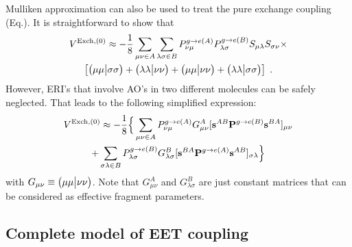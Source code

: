 Mulliken approximation can also be used to treat the pure exchange coupling (Eq.).
It is straightforward to show that
%
\begin{multline}\label{e:v0-exch-mulliken}
V^{{\rm Exch},(0)} \approx -\frac{1}{8} \sum_{\mu\nu\in A} \sum_{\lambda\sigma\in B} 
 P_{\nu\mu}^{g\rightarrow e(A)} P_{\lambda\sigma}^{g\rightarrow e(B)} 
 S_{\mu\lambda}  S_{\sigma\nu} \times \\
 \left[ \bigl( {\mu\mu} \bigl\lvert {\sigma\sigma} \bigr) + \bigl( {\lambda\lambda} \bigl\lvert {\nu\nu} \bigr) 
      + \bigl( {\mu\mu} \bigl\lvert {\nu\nu} \bigr) + \bigl( {\lambda\lambda} \bigl\lvert {\sigma\sigma} \bigr)\right] \;.
\end{multline}
%
However, ERI's that involve AO's in two different molecules can be safely neglected.
That leads to the following simplified expression:
%
\begin{multline}\label{e:v0-exch.mulliken.working}
V^{{\rm Exch},(0)} \approx 
  -\frac{1}{8} \Big\{ \sum_{\mu\nu\in A} P_{\nu\mu}^{g\rightarrow e(A)} G_{\mu\nu}^A
    [{\bf s}^{AB} {\bf P}^{g\rightarrow e(B)} {\bf s}^{BA} ]_{\mu\nu} \\
  + \sum_{\sigma\lambda\in B} P_{\lambda\sigma}^{g\rightarrow e(B)} G_{\lambda\sigma}^B
    [{\bf s}^{BA} {\bf P}^{g\rightarrow e(A)} {\bf s}^{AB} ]_{\sigma\lambda} 
  \Big\}
\end{multline}
%
with $G_{\mu\nu} \equiv \bigl( {\mu\mu} \bigl\lvert {\nu\nu} \bigr)$. Note that $G_{\mu\nu}^A$ and $G_{\lambda\sigma}^B$
are just constant matrices that can be considered as effective fragment parameters.

\subsection{\label{s:2.4}Complete model of EET coupling}

